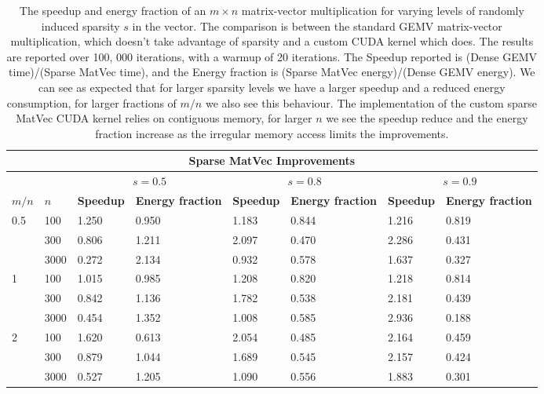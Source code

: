 \documentclass{article}
\theoremstyle{plain}
\theoremstyle{definition}
\theoremstyle{remark}
\begin{document}
\begin{table}[ht!]
\centering
\caption{The speedup and energy fraction of an $m \times n$ matrix-vector multiplication for varying levels of randomly induced sparsity $s$ in the vector. The comparison is between the standard GEMV matrix-vector multiplication, which doesn't take advantage of sparsity and a custom CUDA kernel which does. The results are reported over 100, 000 iterations, with a warmup of 20 iterations. The Speedup reported is (Dense GEMV time)/(Sparse MatVec time), and the Energy fraction is (Sparse MatVec energy)/(Dense GEMV energy). We can see as expected that for larger sparsity levels we have a larger speedup and a reduced energy consumption, for larger fractions of $m/n$ we also see this behaviour. The implementation of the custom sparse MatVec CUDA kernel relies on contiguous memory, for larger $n$ we see the speedup reduce and the energy fraction increase as the irregular memory access limits the improvements. }
\begin{tabular}
{p{0.4cm}p{0.7cm}|p{1.2cm}p{1.5cm}|p{1.2cm}p{1.5cm}|p{1.2cm}p{1.5cm}}
\toprule
\multicolumn{8}{c}{\textbf{Sparse MatVec Improvements}} \\ 
\midrule
 &   &  \multicolumn{2}{|c|}{$s=0.5$} & \multicolumn{2}{|c|}{$s=0.8$} & \multicolumn{2}{|c}{$s=0.9$} \\
\midrule
  $m/n$& $n$  &\textbf{Speedup} & \textbf{Energy fraction} &\textbf{Speedup} & \textbf{Energy fraction}  &\textbf{Speedup} & \textbf{Energy fraction}  \\ 
\midrule
\multirow[t]{3}{*}{0.5} & 100 & 1.250 & 0.950 & 1.183 & 0.844 & 1.216 & 0.819 \\
 & 300 & 0.806 & 1.211 & 2.097 & 0.470 & 2.286 & 0.431 \\
 & 3000 & 0.272 & 2.134 & 0.932 & 0.578 & 1.637 & 0.327 \\
\cline{1-8}
\multirow[t]{3}{*}{1} & 100 & 1.015 & 0.985 & 1.208 & 0.820 & 1.218 & 0.814 \\
 & 300 & 0.842 & 1.136 & 1.782 & 0.538 & 2.181 & 0.439 \\
 & 3000 & 0.454 & 1.352 & 1.008 & 0.585 & 2.936 & 0.188 \\
\cline{1-8}
\multirow[t]{3}{*}{2} & 100 & 1.620 & 0.613 & 2.054 & 0.485 & 2.164 & 0.459 \\
 & 300 & 0.879 & 1.044 & 1.689 & 0.545 & 2.157 & 0.424 \\
 & 3000 & 0.527 & 1.205 & 1.090 & 0.556 & 1.883 & 0.301 \\

\end{tabular}
\label{matvec_speedup}
\end{table}
\end{document}
